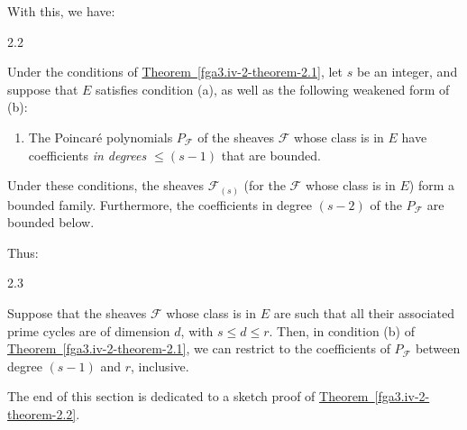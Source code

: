   With this, we have:\begin{theorem}{2.2}\label{fga3.iv-2-theorem-2.2}\skipsinglepar\par{}Under the conditions of \hyperref[fga3.iv-2-theorem-2.1]{Theorem~\ref*{fga3.iv-2-theorem-2.1}}, let \(s\) be an integer, and suppose that \(E\) satisfies condition (a), as well as the following weakened form of (b):

    
 \begin{enumerate}
      
 \item[bs.]
        The Poincaré polynomials \(P_\mathscr {F}\) of the sheaves \(\mathscr {F}\) whose class is in \(E\) have coefficients \emph{in degrees \(\leqslant  (s-1)\)} that are bounded.
      

    \end{enumerate}


    Under these conditions, the sheaves \(\mathscr {F}_{(s)}\) (for the \(\mathscr {F}\) whose class is in \(E\)) form a bounded family.
    Furthermore, the coefficients in degree \((s-2)\) of the \(P_\mathscr {F}\) are bounded below.\end{theorem}\par{}Thus:\begin{corollary}{2.3}\label{fga3.iv-2-corollary-2.3}\skipsinglepar\par{}Suppose that the sheaves \(\mathscr {F}\) whose class is in \(E\) are such that all their associated prime cycles are of dimension \(d\), with \(s\leqslant  d\leqslant  r\).
    Then, in condition (b) of \hyperref[fga3.iv-2-theorem-2.1]{Theorem~\ref*{fga3.iv-2-theorem-2.1}}, we can restrict to the coefficients of \(P_\mathscr {F}\) between degree \((s-1)\) and \(r\), inclusive.\end{corollary}\par{}The end of this section is dedicated to a sketch proof of \hyperref[fga3.iv-2-theorem-2.2]{Theorem~\ref*{fga3.iv-2-theorem-2.2}}.
